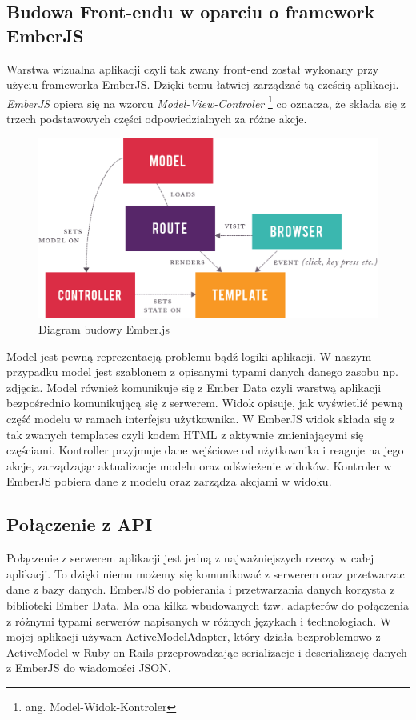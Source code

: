 \documentclass[brudnopis]{xmgr}
\begin{document}
\subsection{Budowa Front-endu w oparciu o framework EmberJS }
Warstwa wizualna aplikacji czyli tak zwany front-end został wykonany przy użyciu frameworka EmberJS. Dzięki temu łatwiej zarządzać tą cześcią aplikacji. \textit{EmberJS} opiera się na wzorcu \textit{Model-View-Controler} \footnote{ang. Model-Widok-Kontroler} co oznacza, że składa się z
trzech podstawowych części odpowiedzialnych za różne akcje. 
\begin{figure}[H]
\centering
\includegraphics[width=0.7\hsize]{images/ember.png}
\caption{Diagram budowy Ember.js\label{RYS.1}}
\end{figure}
Model  jest pewną reprezentacją problemu bądź logiki aplikacji. W naszym przypadku model jest szablonem z opisanymi typami danych danego zasobu np. zdjęcia. Model również komunikuje się z Ember Data czyli warstwą aplikacji bezpośrednio komunikującą się z serwerem.  Widok opisuje, jak wyświetlić pewną część modelu w ramach interfejsu użytkownika. W EmberJS widok składa się z tak zwanych templates czyli kodem HTML z aktywnie zmieniającymi się częściami. Kontroller przyjmuje dane wejściowe od użytkownika i reaguje na jego akcje, zarządzając aktualizacje modelu oraz odświeżenie widoków. Kontroler w EmberJS pobiera dane z modelu oraz zarządza akcjami w widoku.

\subsection{Połączenie z API}
Połączenie z serwerem aplikacji jest jedną z najważniejszych rzeczy w całej aplikacji. To dzięki niemu możemy się komunikować z serwerem oraz przetwarzac dane z bazy danych. EmberJS do pobierania i przetwarzania danych korzysta z biblioteki Ember Data. Ma ona kilka wbudowanych tzw. adapterów do połączenia z różnymi typami serwerów napisanych w różnych językach i technologiach. W mojej aplikacji używam ActiveModelAdapter, który działa bezproblemowo z ActiveModel w Ruby on Rails przeprowadzając serializacje i deserializację danych z EmberJS do wiadomości JSON.
\end{document}
